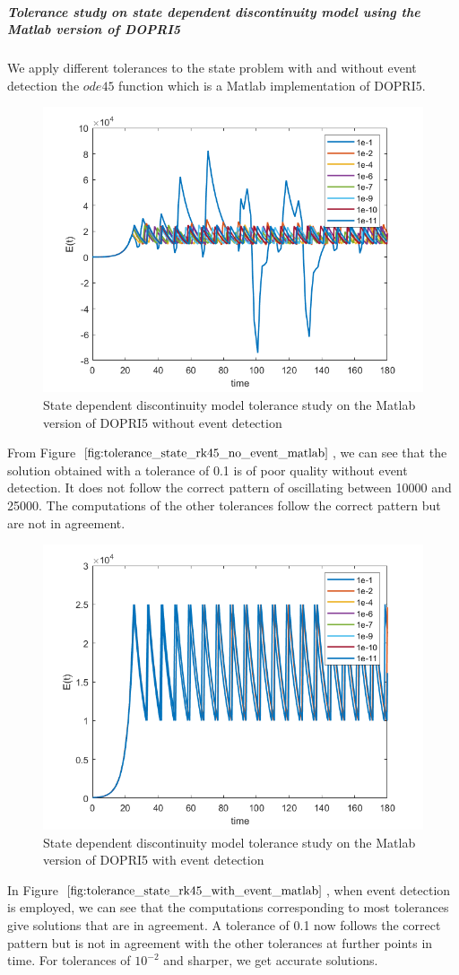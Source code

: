 \subparagraph{Tolerance study on state dependent discontinuity model using the Matlab version of DOPRI5}
We apply different tolerances to the state problem with and without event detection the $ode45$ function which is a Matlab implementation of DOPRI5.

\begin{figure}[h]
\centering
\includegraphics[width=0.7\linewidth]{./figures/tolerance_state_rk45_no_event_matlab}
\caption{State dependent discontinuity model tolerance study on the Matlab version of DOPRI5 without event detection}
\label{fig:tolerance_state_rk45_no_event_matlab}
\end{figure}

From Figure $\ref{fig:tolerance_state_rk45_no_event_matlab}$, we can see that the solution obtained with a tolerance of 0.1 is of poor quality without event detection. It does not follow the correct pattern of oscillating between 10000 and 25000. The computations of the other tolerances follow the correct pattern but are not in agreement.

\begin{figure}[h]
\centering
\includegraphics[width=0.7\linewidth]{./figures/tolerance_state_rk45_with_event_matlab}
\caption{State dependent discontinuity model tolerance study on the Matlab version of DOPRI5 with event detection}
\label{fig:tolerance_state_rk45_with_event_matlab}
\end{figure}
In Figure $\ref{fig:tolerance_state_rk45_with_event_matlab}$, when event detection is employed, we can see that the computations corresponding to most tolerances give solutions that are in agreement. A tolerance of 0.1 now follows the correct pattern but is not in agreement with the other tolerances at further points in time. For tolerances of $10^{-2}$ and sharper, we get accurate solutions.

